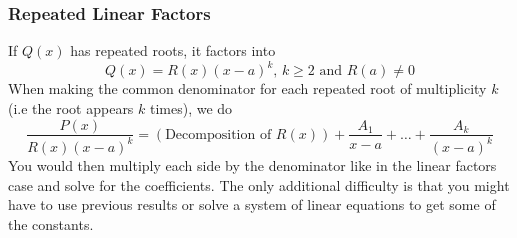 \subsubsection{Repeated Linear Factors}
\noindent
If $Q(x)$ has repeated roots, it factors into
\begin{equation*}
	Q(x) = R(x)(x-a)^k\text{, }k \geq 2\text{ and }R(a) \neq 0
\end{equation*}
When making the common denominator for each repeated root of multiplicity $k$ (i.e the root appears $k$ times), we do
\begin{equation*}
	\frac{P(x)}{R(x)(x-a)^k} = \left(\text{Decomposition of }R(x)\right) + \frac{A_1}{x-a}+\ldots+\frac{A_k}{(x-a)^k}
\end{equation*}
You would then multiply each side by the denominator like in the linear factors case and solve for the coefficients. The only additional difficulty is that you might have to use previous results or solve a system of linear equations to get some of the constants.

